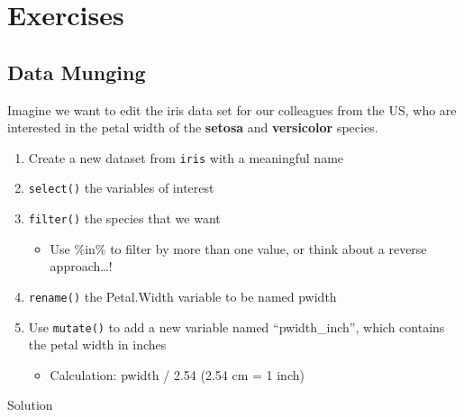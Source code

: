 \documentclass[
]{book}
\providecommand{\tightlist}{%
  \setlength{\itemsep}{0pt}\setlength{\parskip}{0pt}}
\begin{document}
\section*{Exercises}\label{exercises-1}

\subsection*{Data Munging}\label{data-munging}

Imagine we want to edit the iris data set for our colleagues from the US, who are interested in the petal width of the \textbf{setosa} and \textbf{versicolor} species.

\begin{enumerate}
\def\labelenumi{\arabic{enumi}.}
\tightlist
\item
  Create a new dataset from \texttt{iris} with a meaningful name
\item
  \texttt{select()} the variables of interest
\item
  \texttt{filter()} the species that we want

  \begin{itemize}
  \tightlist
  \item
    Use \%in\% to filter by more than one value, or think about a reverse approach\ldots!
  \end{itemize}
\item
  \texttt{rename()} the Petal.Width variable to be named pwidth
\item
  Use \texttt{mutate()} to add a new variable named ``pwidth\_inch'', which contains the petal width in inches

  \begin{itemize}
  \tightlist
  \item
    Calculation: pwidth / 2.54 (2.54 cm = 1 inch)
  \end{itemize}
\end{enumerate}

Solution
\end{document}
